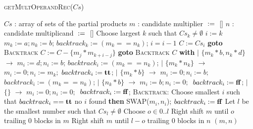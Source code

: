 \begin{algorithm}[t]
 \caption{\textsc{getMultOperandRec}($Cs$)}
 \label{alg:hb}
 \begin{algorithmic}[1]
   \Ensure $Cs$ : array of sets of the partial products
   \State $m$ : candidate multiplier $\;\mathtt{:=}\;$ []
   \State $n$ : candidate multiplicand $\;\mathtt{:=}\;$ []
   \State Choose largest $k$ such that $Cs_k\neq \emptyset$
   \State $i := k$
   \State $m_k := a; n_k := b$; $backtrack_k := (m_k == n_k)$; 
   \Else
   \EndIf
   \State $i = i - 1 $
   \State $C := Cs_i$
    {\bf goto }{\textsc{Backtrack}}
   \State $C := C - \{m_j*m_{k+i-j}\}$
   \EndIf
   \EndFor
    {\bf goto }{\textsc{Backtrack}}
    $C$ {\bf with}
   \State\quad $\mid$ $\{m_k*b,n_k*d\}$ $\rightarrow$ $m_i := d; n_i := b$;
   $backtrack_i := (m_k == n_k)$; 
   \State\quad $\mid$ $\{m_k*n_k\}$ $\rightarrow$ $m_i := 0; n_i := m_k;$
   $backtrack_i := \mathbf{tt}$; 
   \State \quad$\mid$ $\{m_k*b\}$ $\rightarrow$ $m_i := 0; n_i := b;$
   $backtrack_i := (m_k == n_k)$; 
   \State \quad $\mid$ $\{n_k*b\}$ $\rightarrow$ $m_i := b; n_i := 0;$\
   $backtrack_i := \mathbf{ff}$; 
   \State \quad $\mid$ $\{\}$ $\rightarrow$ $m_i := 0; n_i := 0;$\
   $backtrack_i := \mathbf{ff}$; 
   \State {\bf continue;}
   \State \textsc{Backtrack:}
   \State \quad Choose smallest $i$ such that $backtrack_i == \mathbf{tt}$
   \State \quad {\bf if} no $i$ found {\bf then} 
   \State \quad \textsc{SWAP}($m_i,n_i$); $backtrack_i := \mathbf{ff}$
   \EndWhile
   \State Let $l$ be the smallest number such that $Cs_l\neq \emptyset$
   \State Choose $o \in 0..l$
   \State Right shift $m$ until $o$ trailing $0$ blocks in $m$
   \State Right shift $m$ until $l-o$ trailing $0$ blocks in $n$
   \State \Return $(m,n)$
 \end{algorithmic}
\end{algorithm}  


